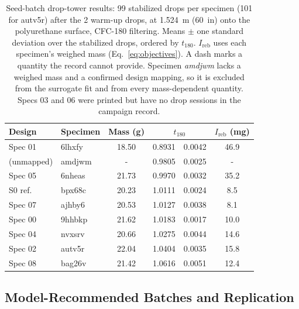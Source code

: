 \documentclass[lineno,nocopyright,upint,varvw,hyphenate]{asmejour}
\begin{document}
\begin{table}[t]
  \centering
  \caption{Seed-batch drop-tower results: 99 stabilized drops per
    specimen (101 for autv5r) after the 2 warm-up drops, at \SI{1.524}{m} (\SI{60}{in})
    onto the polyurethane surface, CFC-180 filtering. Means $\pm$ one
    standard deviation over the stabilized drops, ordered by $t_{180}$.
    $I_{\mathrm{reb}}$ uses each specimen's weighed mass
    (Eq.~\eqref{eq:objectives}). A dash marks a quantity the record
    cannot provide. Specimen \textit{amdjwm} lacks a weighed mass and a
    confirmed design mapping, so it is excluded from the surrogate fit
    and from every mass-dependent quantity. Specs 03 and 06 were printed
    but have no drop sessions in the campaign record.}
  \label{tab:seed-results}
  \small
  \begin{tabular}{@{}llS[table-format=2.2]S[table-format=1.4]@{\,$\pm$\,}S[table-format=1.4]S[table-format=2.1]@{}}
    \toprule
    Design & Specimen & {Mass (g)} &  &
    {$I_{\mathrm{reb}}$ (mg)} \\
    \midrule
    Spec 01 & 6lhxfy & 18.50 & 0.8931 & 0.0042 & 46.9 \\
    (unmapped) & amdjwm & {-} & 0.9805 & 0.0025 & {-} \\
    Spec 05 & 6nheas & 21.73 & 0.9970 & 0.0032 & 35.2 \\
    S0 ref. & bpx68c & 20.23 & 1.0111 & 0.0024 & 8.5 \\
    Spec 07 & ajhby6 & 20.53 & 1.0127 & 0.0038 & 8.1 \\
    Spec 00 & 9hhbkp & 21.62 & 1.0183 & 0.0017 & 10.0 \\
    Spec 04 & nvxsrv & 20.66 & 1.0275 & 0.0044 & 14.6 \\
    Spec 02 & autv5r & 22.04 & 1.0404 & 0.0035 & 15.8 \\
    Spec 08 & bag26v & 21.42 & 1.0616 & 0.0051 & 12.4 \\
    \bottomrule
  \end{tabular}
\end{table}

\subsection{Model-Recommended Batches and Replication}
\label{sec:results:batches}
\end{document}
